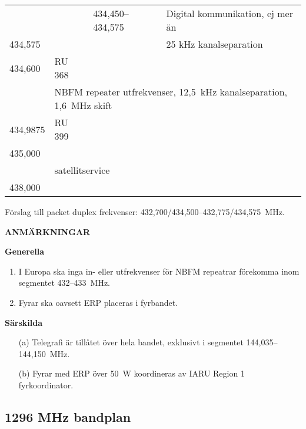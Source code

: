 \begin{longtable}{llll}
        &            & 434,450--434,575 & Digital kommunikation, ej mer än \\
434,575 &            &                   & 25 kHz kanalseparation \\
434,600 & RU 368 & & \\
        & \multicolumn{3}{l}{NBFM repeater utfrekvenser, 12,5~kHz kanalseparation, 1,6~MHz skift} \\
434,9875 & RU 399 & & \\
435,000 & & & \\
        & \multicolumn{3}{l}{satellitservice} \\
438,000 & & & \\
\end{longtable}

Förslag till packet duplex frekvenser: 432,700/434,500--432,775/434,575~MHz.

\textbf{ANMÄRKNINGAR}

\textbf{Generella}

\begin{enumerate}[label=\alph*.]
\item I Europa ska inga in- eller utfrekvenser för NBFM repeatrar
  förekomma inom segmentet 432--433~MHz.
\item Fyrar ska oavsett ERP placeras i fyrbandet.
\end{enumerate}

\textbf{Särskilda}

\begin{itemize}
\item[(a)] Telegrafi är tillåtet över hela bandet, exklusivt i segmentet
  144,035--144,150~MHz.
\item[(b)] Fyrar med ERP över 50~W koordineras av IARU Region 1 fyrkoordinator.
\end{itemize}

\subsection{1296 MHz bandplan}

